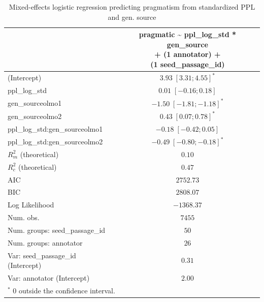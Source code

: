 
\usepackage{booktabs}

\begin{table}[htbp]
\begin{center}
\begin{tabular}{l c}
\toprule
 & \shortstack[l]{pragmatic \textasciitilde{} ppl\_log\_std * gen\_source  \\ 
+ (1 \textbar{} annotator) + \\ 
(1 \textbar{} seed\_passage\_id)} \\
\midrule
(Intercept)                        & $3.93 \; [ 3.31;  4.55]^{*}$  \\
ppl\_log\_std                      & $0.01 \; [-0.16;  0.18]$      \\
gen\_sourceolmo1                   & $-1.50 \; [-1.81; -1.18]^{*}$ \\
gen\_sourceolmo2                   & $0.43 \; [ 0.07;  0.78]^{*}$  \\
ppl\_log\_std:gen\_sourceolmo1     & $-0.18 \; [-0.42;  0.05]$     \\
ppl\_log\_std:gen\_sourceolmo2     & $-0.49 \; [-0.80; -0.18]^{*}$ \\
\midrule
$R^2_m$ (theoretical)              & $0.10$                        \\
$R^2_c$ (theoretical)              & $0.47$                        \\
AIC                                & $2752.73$                     \\
BIC                                & $2808.07$                     \\
Log Likelihood                     & $-1368.37$                    \\
Num. obs.                          & $7455$                        \\
Num. groups: seed\_passage\_id     & $50$                          \\
Num. groups: annotator             & $26$                          \\
Var: seed\_passage\_id (Intercept) & $0.31$                        \\
Var: annotator (Intercept)         & $2.00$                        \\
\bottomrule
\multicolumn{2}{l}{\scriptsize{$^*$ 0 outside the confidence interval.}}
\end{tabular}
\caption{Mixed-effects logistic regression predicting pragmatism from standardized PPL and gen. source}
\label{tab:glmer_ppl_prag_src}
\end{center}
\end{table}
